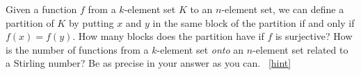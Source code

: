 \documentclass{book}
\begin{document}
\setcounter{project}{203}
\addtocounter{project}{-1}
\begin{activity}[]\label{activity-196}
\hypertarget{p-1149}{}%
Given a function \(f\) from a \(k\)-element set \(K\) to an \(n\)-element set, we can define a partition of \(K\) by putting \(x\) and \(y\) in the same block of the partition if and only if \(f(x)=f(y)\). How many blocks does the partition have if \(f\) is surjective? How is the number of functions from a \(k\)-element set \emph{onto} an \(n\)-element set related to a Stirling number? Be as precise in your answer as you can.%
~\hfill{\tiny\hyperlink{a-203}{[hint]}\hypertarget{q-203}{}}\end{activity}
\end{document}
